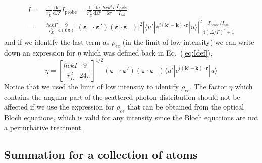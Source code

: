 \documentclass[11pt,letter]{article}
\newcommand{\bv}[1]{\ensuremath{\bm{#1}}}
\begin{document}
\begin{equation}
\begin{split}
I  =& \frac{1}{r_{D}^{2}} \frac{ \mathrm{d} \sigma } { \mathrm{d} \Omega'}
      I_{\mathrm{probe}} 
   =   \frac{1}{r_{D}^{2}} \frac{ \mathrm{d} \sigma } { \mathrm{d} \Omega'}
      \frac{\hbar c k^{3}\Gamma}{6 \pi} \frac{I_{\mathrm{probe}}}{I_{\mathrm{sat}}}  \\ 
   =& \frac{\hbar c k \Gamma}{r_{D}^{2}}  
    \frac{9}{4 (6\pi)} 
        |(\bv{\varepsilon}_{-}\cdot \bv{\varepsilon}' )
                       (\bv{\varepsilon}\cdot \bv{\varepsilon}_{-} ) |^{2}
    \left|
      \langle u' | e^{i(\bv{k}'-\bv{k}) \cdot\bv{r}} | u  \rangle
  \right| ^{2}
     \frac{ I_{\mathrm{probe}} / I_{\mathrm{sat}}}
        { 4(\Delta/\Gamma)^{2} + 1 }
\end{split}
\end{equation}
and if we identify the last term as $\rho_{ee}$ (in the limit of low intensity) we can write down an expression for $\eta$ which was defined back in Eq.~(\ref{eq:Idef}), 
\begin{equation}
  \eta = \left[ \frac{\hbar c k \Gamma}{r_{D}^{2}}  
    \frac{9}{24\pi} \right]^{1/2} 
        (\bv{\varepsilon}_{-}\cdot \bv{\varepsilon}' )
                       (\bv{\varepsilon}\cdot \bv{\varepsilon}_{-} ) 
      \langle u' | e^{i(\bv{k}'-\bv{k}) \cdot\bv{r}} | u  \rangle
\end{equation}
Notice that we used the limit of low intensity to identify $\rho_{ee}$.  The factor $\eta$ which contains the angular part of the scattered photon distribution should not be affected if we use the expression for $\rho_{ee}$ that can be obtained from the optical Bloch equations, which is valid for any intensity since the Bloch equations are not a perturbative treatment. 

\subsection{Summation for a collection of atoms} 
\end{document}
